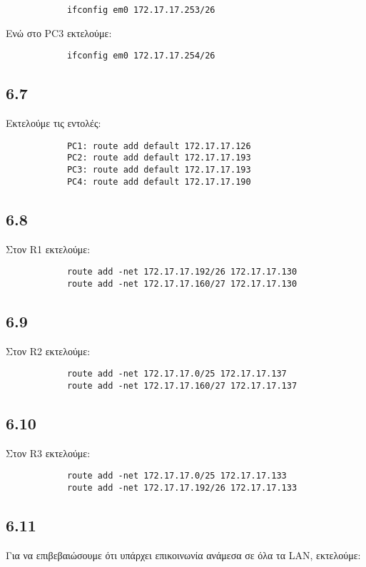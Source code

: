 \documentclass[a4paper, 12pt]{article}
\begin{document}
		\begin{verbatim}
			ifconfig em0 172.17.17.253/26
		\end{verbatim}
		
		Ενώ στο PC3 εκτελούμε:
		
		\begin{verbatim}
			ifconfig em0 172.17.17.254/26
		\end{verbatim}

	\subsection*{6.7}
		Εκτελούμε τις εντολές:
		
		\begin{verbatim}
			PC1: route add default 172.17.17.126
			PC2: route add default 172.17.17.193
			PC3: route add default 172.17.17.193
			PC4: route add default 172.17.17.190
		\end{verbatim}

	\subsection*{6.8}
		Στον R1 εκτελούμε:
		
		\begin{verbatim}
			route add -net 172.17.17.192/26 172.17.17.130
			route add -net 172.17.17.160/27 172.17.17.130
		\end{verbatim}

	\subsection*{6.9}
		Στον R2 εκτελούμε:
		
		\begin{verbatim}
			route add -net 172.17.17.0/25 172.17.17.137
			route add -net 172.17.17.160/27 172.17.17.137
		\end{verbatim}

	\subsection*{6.10}
		Στον R3 εκτελούμε:
		
		\begin{verbatim}
			route add -net 172.17.17.0/25 172.17.17.133
			route add -net 172.17.17.192/26 172.17.17.133
		\end{verbatim}

	\subsection*{6.11}
		Για να επιβεβαιώσουμε ότι υπάρχει επικοινωνία ανάμεσα σε όλα τα LAN, εκτελούμε:
		
\end{document}
